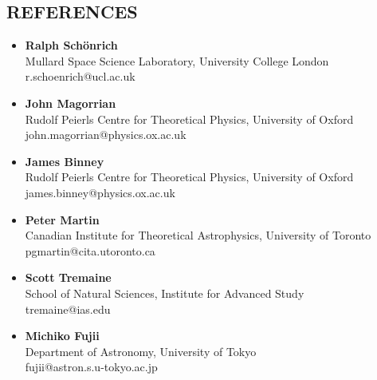 \documentclass[]{res}
\begin{document}
\begin{resume}
\section{REFERENCES}
\begin{itemize}[leftmargin=*]
    \item \textbf{Ralph Sch\"onrich}\\
    Mullard Space Science Laboratory, University College London\\
    r.schoenrich@ucl.ac.uk
    \item \textbf{John Magorrian}\\
    Rudolf Peierls Centre for Theoretical Physics, University of Oxford\\
    john.magorrian@physics.ox.ac.uk
    \item \textbf{James Binney}\\
    Rudolf Peierls Centre for Theoretical Physics, University of Oxford\\
    james.binney@physics.ox.ac.uk
    \item \textbf{Peter Martin}\\
    Canadian Institute for Theoretical Astrophysics, University of Toronto\\
    pgmartin@cita.utoronto.ca
    \item \textbf{Scott Tremaine}\\
    School of Natural Sciences, Institute for Advanced Study\\
    tremaine@ias.edu
    \item \textbf{Michiko Fujii}\\
    Department of Astronomy, University of Tokyo\\
    fujii@astron.s.u-tokyo.ac.jp
\end{itemize}


\end{resume}
\end{document}

